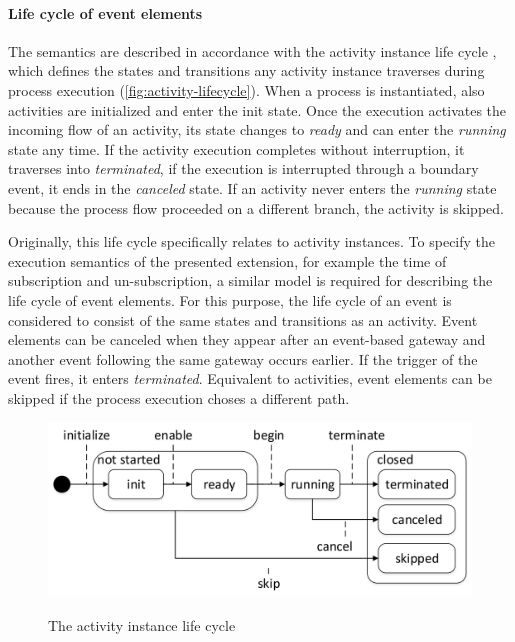 \paragraph{Life cycle of event elements}
The semantics are described in accordance with the activity instance life cycle \cite[p.\,84]{weske:bpm-book}, which defines the states and transitions any activity instance traverses during process execution (\autoref{fig:activity-lifecycle}).
When a process is instantiated, also activities are initialized and enter the init state.
Once the execution activates the incoming flow of an activity, its state changes to \textit{ready} and can enter the \textit{running} state any time. If the activity execution completes without interruption, it traverses into \textit{terminated}, if the execution is interrupted through a boundary event, it ends in the \textit{canceled} state.
If an activity never enters the \textit{running} state because the process flow proceeded on a different branch, the activity is skipped.

Originally, this life cycle specifically relates to activity instances.
To specify the execution semantics of the presented extension, for example the time of subscription and un-subscription, a similar model is required for describing the life cycle of event elements.
For this purpose, the life cycle of an event is considered to consist of the same states and transitions as an activity.
Event elements can be canceled when they appear after an event-based gateway and another event following the same gateway occurs earlier.
If the trigger of the event fires, it enters \textit{terminated}. Equivalent to activities, event elements can be skipped if the process execution choses a different path.

\begin{figure}[]
	\myfloatalign
	{\includegraphics[width=1\linewidth]{chapters/concept/bpmnx/activity-lifecycle.png}}
	\caption{The activity instance life cycle}\label{fig:activity-lifecycle}
\end{figure}

